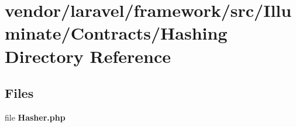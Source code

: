 \section{vendor/laravel/framework/src/\+Illuminate/\+Contracts/\+Hashing Directory Reference}
\label{dir_4d3c98f4a8158a2be46eda735863878d}
\subsection*{Files}
\begin{DoxyCompactItemize}
\item 
file {\bf Hasher.\+php}
\end{DoxyCompactItemize}
